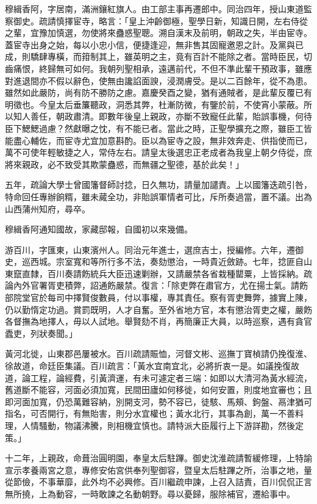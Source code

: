 \begin{pinyinscope}
穆緝香阿，字居南，滿洲鑲紅旗人。由工部主事再遷郎中。同治四年，授山東道監察御史。疏請慎擇宦寺，略言：「皇上沖齡御極，聖學日新，知識日開，左右侍從之輩，宜豫加慎選，勿使將來蠱惑聖聰。溯自漢末及前明，朝政之失，半由宦寺。蓋宦寺出身之始，每以小忠小信，便捷逢迎，無非售其固寵邀恩之計。及黨與已成，則驕肆專橫，而箝制其上，雖英明之主，竟有百計不能除之者。當時臣民，切齒痛恨，終歸無可如何。我朝列聖相承，遠邁前代，不但不準此輩干預政事，雖應對進退間亦不假以辭色，使無由讒諂面諛，浸潤膚受。是以二百餘年，從不為患。雖然如此嚴防，尚有防不勝防之慮。嘉慶癸酉之變，猶有通賊者，是此輩反覆已有明徵也。今皇太后垂簾聽政，洞悉其弊，杜漸防微，有鑒於前，不使宵小蒙蔽。所以知人善任，朝政肅清。即數年後皇上親政，亦斷不致寵任此輩，貽誤事機，何待臣下鰓鰓過慮？然獻曝之忱，有不能已者。當此之時，正聖學擴充之際，雖臣工皆能盡心輔佐，而宦寺尤宜加意斟酌。臣以為宦寺之設，無非效奔走、供指使而已，萬不可使年輕敏捷之人，常侍左右。請皇太後選忠正老成者為我皇上朝夕侍從，庶將來親政，必不致受其欺蒙蠱惑，而無疆之聖德，基於此矣！」

五年，疏論大學士曾國籓督師討捻，日久無功，請量加譴責。上以國籓迭疏引咎，特命回任專辦餉糈，雖未蕆全功，非貽誤軍情者可比，斥所奏過當，置不議。出為山西蒲州知府，尋卒。

穆緝香阿通知國故，家藏邸報，自國初以來幾備。

游百川，字匯東，山東濱州人。同治元年進士，選庶吉士，授編修。六年，遷御史，巡西城。宗室寬和等所行多不法，奏劾懲治，一時貴近斂跡。七年，捻匪自山東竄直隸，百川奏請飭統兵大臣迅速剿辦，又請嚴禁各省栽種罌粟，上皆採納。疏論內外官署胥吏積弊，詔通飭嚴禁。復言：「除吏弊在肅官方，尤在揚士氣。請飭部院堂官於每司中擇賢俊數員，付以事權，專其責任。察有胥吏舞弊，據實上陳，仍以勤惰定功過。賞罰既明，人才自奮。至外省地方官，本有懲治胥吏之權，嚴飭各督撫為地擇人，毋以人試地。舉賢劾不肖，再簡廉正大員，以時巡察，遇有貪官蠹吏，列狀奏聞。」

黃河北徙，山東郡邑屢被水。百川疏請賑恤，河督文彬、巡撫丁寶楨請仍挽復淮、徐故道，命廷臣集議。百川疏言：「黃水宜南宜北，必將折衷一是。如議挽復故道，論工程，論經費，引黃濟運，有未可遽定者三端：如即以大清河為黃水經流，舊道斷不能容，河面必須加寬，民間田廬如何移徙，如何安置，則度地宜審也；且即河面加寬，仍恐萬難容納，別開支河，勢不容已，徒駭、馬頰、鉤盤、鬲津猶可指名，可否開行，有無貽害，則分水宜權也；黃水北行，其事為創，萬一不善料理，人情騷動，物議沸騰，則相機宜慎也。請特派大臣履行上下游詳勘，然後定策。」

十二年，上親政，命葺治圓明園，奉皇太后駐蹕。御史沈淮疏請暫緩修理，上特諭宣示孝養兩宮之意，專修安佑宮供奉列聖御容，暨皇太后駐蹕之所，治事之地，量從節儉，不事華靡，此外均不必興修。百川繼疏申諫，上召入詰責，百川侃侃正言無所撓，上為動容，一時敢諫之名動朝野。尋以憂歸，服除補官，遷給事中。


\end{pinyinscope}
